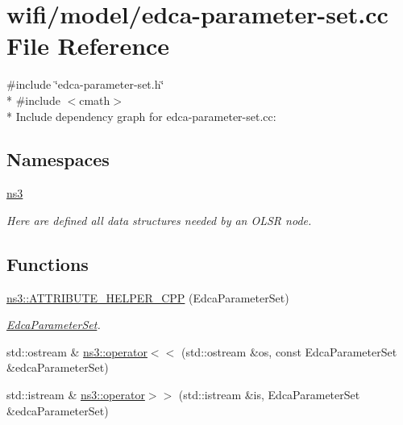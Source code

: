\hypertarget{edca-parameter-set_8cc}{}\section{wifi/model/edca-\/parameter-\/set.cc File Reference}
\label{edca-parameter-set_8cc}
{\ttfamily \#include \char`\"{}edca-\/parameter-\/set.\+h\char`\"{}}\\*
{\ttfamily \#include $<$cmath$>$}\\*
Include dependency graph for edca-\/parameter-\/set.cc\+:
\subsection*{Namespaces}
\begin{DoxyCompactItemize}
\item 
 \hyperlink{namespacens3}{ns3}
\begin{DoxyCompactList}\small\item\em Here are defined all data structures needed by an O\+L\+SR node. \end{DoxyCompactList}\end{DoxyCompactItemize}
\subsection*{Functions}
\begin{DoxyCompactItemize}
\item 
\hyperlink{namespacens3_a38306ed13c9e4b03431c0c38db3a65dc}{ns3\+::\+A\+T\+T\+R\+I\+B\+U\+T\+E\+\_\+\+H\+E\+L\+P\+E\+R\+\_\+\+C\+PP} (Edca\+Parameter\+Set)
\begin{DoxyCompactList}\small\item\em \hyperlink{classns3_1_1EdcaParameterSet}{Edca\+Parameter\+Set}. \end{DoxyCompactList}\item 
std\+::ostream \& \hyperlink{namespacens3_aac75e3a89f5c3fd5176c9f6f6207b5f7}{ns3\+::operator$<$$<$} (std\+::ostream \&os, const Edca\+Parameter\+Set \&edca\+Parameter\+Set)
\item 
std\+::istream \& \hyperlink{namespacens3_aa72e7688c29e91f9322b7b79918521ab}{ns3\+::operator$>$$>$} (std\+::istream \&is, Edca\+Parameter\+Set \&edca\+Parameter\+Set)
\end{DoxyCompactItemize}
